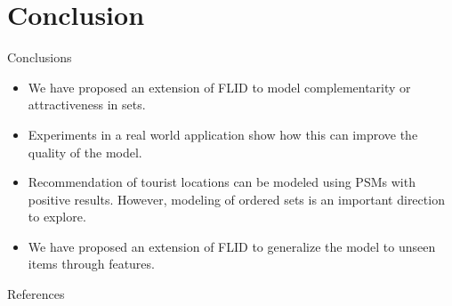 \documentclass{beamer}
\begin{document}
\section{Conclusion}

\begin{frame}{Conclusions}
 \begin{itemize}
   \item We have proposed an extension of FLID to model complementarity or attractiveness in sets.
   \item Experiments in a real world application show how this can improve the quality of the model.
   \item Recommendation of tourist locations can be modeled using PSMs with positive results. However, modeling of ordered sets is an important direction to explore.
   \item We have proposed an extension of FLID to generalize the model to unseen items through features.
  \end{itemize}
\end{frame}

\begin{frame}[allowframebreaks]{References}
  
  
\end{frame}
\end{document}
